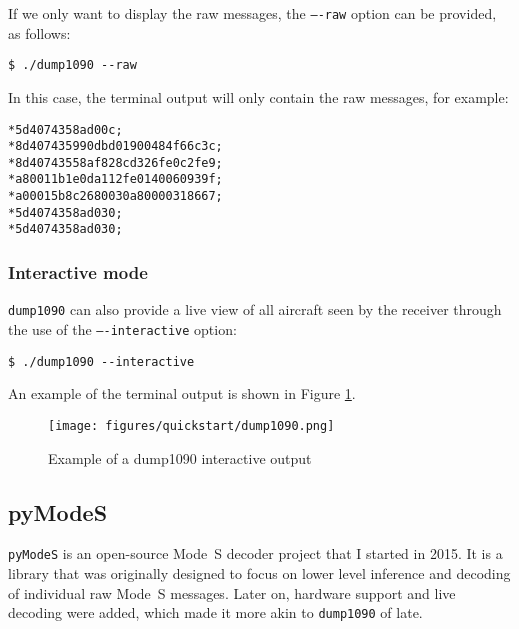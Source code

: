 If we only want to display the  raw messages, the \texttt{----raw} option can be provided, as follows:

\begin{verbatim}
$ ./dump1090 --raw
\end{verbatim}

In this case, the terminal output will only contain the raw messages, for example:

\begin{verbatim}
*5d4074358ad00c;
*8d407435990dbd01900484f66c3c;
*8d40743558af828cd326fe0c2fe9;
*a80011b1e0da112fe0140060939f;
*a00015b8c2680030a80000318667;
*5d4074358ad030;
*5d4074358ad030;
\end{verbatim}

\subsubsection{Interactive mode}

\texttt{dump1090} can also provide a live view of all aircraft seen by the receiver through the use of the \texttt{----interactive} option:

\begin{verbatim}
$ ./dump1090 --interactive
\end{verbatim}

An example of the terminal output is shown in Figure \ref{fig:dump1090}.

\begin{figure}[ht]
  \centering
  \texttt{[image: figures/quickstart/dump1090.png]}
  \caption{Example of a dump1090 interactive output}
  \label{fig:dump1090}
\end{figure}



  


\subsection{pyModeS}
\texttt{pyModeS} is an open-source Mode~S decoder project that I started in 2015. It is a library that was originally designed to focus on lower level inference and decoding of individual raw Mode~S messages. Later on, hardware support and live decoding were added, which made it more akin to \texttt{dump1090} of late.

